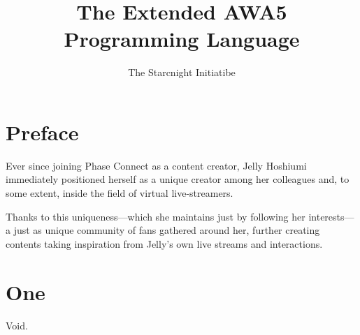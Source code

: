\documentclass[12pt,a4paper,draft]{book}
\author{The Starcnight Initiatibe}
\title{The Extended AWA5 Programming Language}
\begin{document}
\frontmatter
\tableofcontents

\chapter{Preface}
Ever since joining Phase Connect as a content creator, Jelly Hoshiumi
immediately positioned herself as a unique creator among her
colleagues and, to some extent, inside the field of virtual
live-streamers.

Thanks to this uniqueness---which she maintains just by following her
interests---a just as unique community of fans gathered around her,
further creating contents taking inspiration from Jelly's own live
streams and interactions.

\mainmatter
\chapter{One}
Void.
\end{document}
